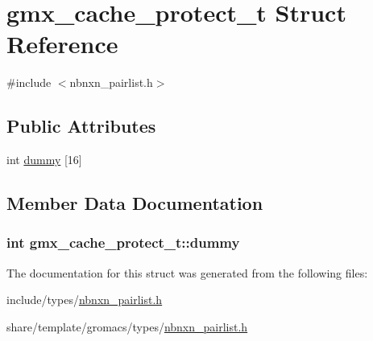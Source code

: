 \hypertarget{structgmx__cache__protect__t}{\section{gmx\-\_\-cache\-\_\-protect\-\_\-t \-Struct \-Reference}
\label{structgmx__cache__protect__t}
}


{\ttfamily \#include $<$nbnxn\-\_\-pairlist.\-h$>$}

\subsection*{\-Public \-Attributes}
\begin{DoxyCompactItemize}
\item 
int \hyperlink{structgmx__cache__protect__t_a50d4677ba82dbbff4f4bcf1aef8eb54d}{dummy} \mbox{[}16\mbox{]}
\end{DoxyCompactItemize}


\subsection{\-Member \-Data \-Documentation}
\hypertarget{structgmx__cache__protect__t_a50d4677ba82dbbff4f4bcf1aef8eb54d}{
\subsubsection[{dummy}]{\setlength{\rightskip}{0pt plus 5cm}int {\bf gmx\-\_\-cache\-\_\-protect\-\_\-t\-::dummy}}}\label{structgmx__cache__protect__t_a50d4677ba82dbbff4f4bcf1aef8eb54d}


\-The documentation for this struct was generated from the following files\-:\begin{DoxyCompactItemize}
\item 
include/types/\hyperlink{include_2types_2nbnxn__pairlist_8h}{nbnxn\-\_\-pairlist.\-h}\item 
share/template/gromacs/types/\hyperlink{share_2template_2gromacs_2types_2nbnxn__pairlist_8h}{nbnxn\-\_\-pairlist.\-h}\end{DoxyCompactItemize}
